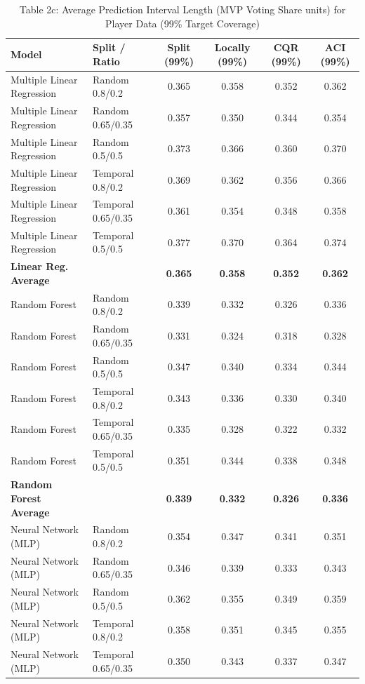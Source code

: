 \documentclass[11pt,a4paper]{article}
\begin{document}
\begin{table}[H]
\centering
\caption{Table 2c: Average Prediction Interval Length (MVP Voting Share units) for Player Data (99\% Target Coverage)}
\label{tab:mvp_tab2c}
\scriptsize
\begin{tabular}{llcccc}
\toprule
Model & Split / Ratio & Split (99\%) & Locally (99\%) & CQR (99\%) & ACI (99\%) \\
\midrule
Multiple Linear Regression & Random 0.8/0.2 & 0.365 & 0.358 & 0.352 & 0.362 \\
Multiple Linear Regression & Random 0.65/0.35 & 0.357 & 0.350 & 0.344 & 0.354 \\
Multiple Linear Regression & Random 0.5/0.5 & 0.373 & 0.366 & 0.360 & 0.370 \\
Multiple Linear Regression & Temporal 0.8/0.2 & 0.369 & 0.362 & 0.356 & 0.366 \\
Multiple Linear Regression & Temporal 0.65/0.35 & 0.361 & 0.354 & 0.348 & 0.358 \\
Multiple Linear Regression & Temporal 0.5/0.5 & 0.377 & 0.370 & 0.364 & 0.374 \\
\textbf{Linear Reg. Average} & & \textbf{0.365} & \textbf{0.358} & \textbf{0.352} & \textbf{0.362} \\
\midrule
Random Forest & Random 0.8/0.2 & 0.339 & 0.332 & 0.326 & 0.336 \\
Random Forest & Random 0.65/0.35 & 0.331 & 0.324 & 0.318 & 0.328 \\
Random Forest & Random 0.5/0.5 & 0.347 & 0.340 & 0.334 & 0.344 \\
Random Forest & Temporal 0.8/0.2 & 0.343 & 0.336 & 0.330 & 0.340 \\
Random Forest & Temporal 0.65/0.35 & 0.335 & 0.328 & 0.322 & 0.332 \\
Random Forest & Temporal 0.5/0.5 & 0.351 & 0.344 & 0.338 & 0.348 \\
\textbf{Random Forest Average} & & \textbf{0.339} & \textbf{0.332} & \textbf{0.326} & \textbf{0.336} \\
\midrule
Neural Network (MLP) & Random 0.8/0.2 & 0.354 & 0.347 & 0.341 & 0.351 \\
Neural Network (MLP) & Random 0.65/0.35 & 0.346 & 0.339 & 0.333 & 0.343 \\
Neural Network (MLP) & Random 0.5/0.5 & 0.362 & 0.355 & 0.349 & 0.359 \\
Neural Network (MLP) & Temporal 0.8/0.2 & 0.358 & 0.351 & 0.345 & 0.355 \\
Neural Network (MLP) & Temporal 0.65/0.35 & 0.350 & 0.343 & 0.337 & 0.347 \\

\end{tabular}
\end{table}
\end{document}
